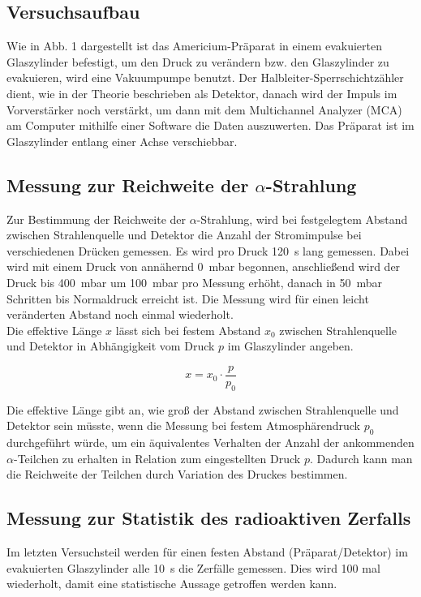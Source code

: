 \subsection{Versuchsaufbau}
Wie in Abb. 1 dargestellt ist das Americium-Präparat in einem evakuierten Glaszylinder befestigt, um den Druck zu verändern bzw. den Glaszylinder zu evakuieren, wird eine Vakuumpumpe benutzt. Der Halbleiter-Sperrschichtzähler dient, wie in der Theorie beschrieben als Detektor, danach wird der Impuls im Vorverstärker noch verstärkt, um dann mit dem Multichannel Analyzer (MCA) am Computer mithilfe einer Software die Daten auszuwerten. Das Präparat ist im Glaszylinder entlang einer Achse verschiebbar.

\subsection{Messung zur Reichweite der $\alpha$-Strahlung}

Zur Bestimmung der Reichweite der $\alpha$-Strahlung, wird bei
festgelegtem Abstand zwischen Strahlenquelle und Detektor die Anzahl der Stromimpulse bei verschiedenen Drücken gemessen. Es wird pro Druck \SI{120}{\second} lang gemessen. Dabei wird mit einem
Druck von annähernd \SI{0}{\milli\bar} begonnen, anschließend wird der Druck bis \SI{400}{\milli\bar} um \SI{100}{\milli\bar} pro Messung erhöht, danach in \SI{50}{\milli\bar} Schritten bis Normaldruck erreicht ist. Die Messung wird für einen leicht veränderten Abstand noch einmal wiederholt.\\

Die effektive Länge $x$ lässt sich bei festem Abstand $x_0$ zwischen
Strahlenquelle und Detektor in Abhängigkeit vom Druck $p$ im Glaszylinder angeben.

\begin{equation}
  \label{eq:effektive_laenge}
  x = x_0 \cdot \frac{p}{p_0}
\end{equation}

Die effektive Länge gibt an, wie groß der Abstand zwischen Strahlenquelle und Detektor sein müsste, wenn die Messung bei festem Atmosphärendruck $p_0$ durchgeführt würde, um ein äquivalentes Verhalten der Anzahl der ankommenden $\alpha$-Teilchen zu erhalten in Relation zum eingestellten Druck $p$. Dadurch kann man die Reichweite der Teilchen durch Variation des Druckes bestimmen.
 
\subsection{Messung zur Statistik des radioaktiven Zerfalls}
Im letzten Versuchsteil werden für einen festen Abstand (Präparat/Detektor) im evakuierten Glaszylinder alle \SI{10}{\second} die Zerfälle gemessen. Dies wird 100 mal wiederholt, damit eine statistische Aussage getroffen werden kann.

